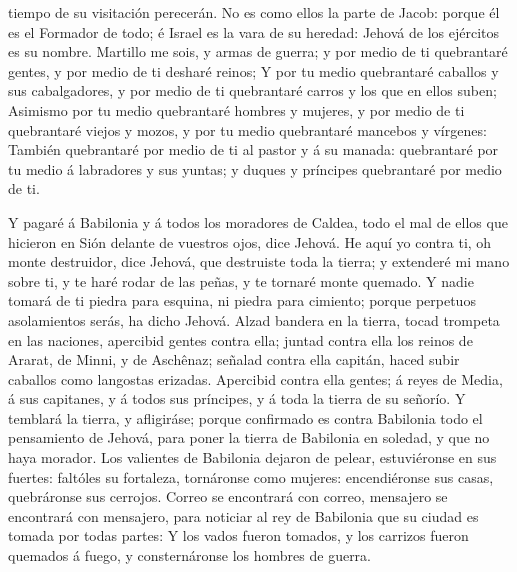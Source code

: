 tiempo de su visitación perecerán.  No es como ellos la
parte de Jacob: porque él es el Formador de todo; é Israel es la vara de
su heredad: Jehová de los ejércitos es su nombre.  Martillo
me sois, y armas de guerra; y por medio de ti quebrantaré gentes, y por
medio de ti desharé reinos;  Y por tu medio quebrantaré
caballos y sus cabalgadores, y por medio de ti quebrantaré carros y los
que en ellos suben;  Asimismo por tu medio quebrantaré
hombres y mujeres, y por medio de ti quebrantaré viejos y mozos, y por
tu medio quebrantaré mancebos y vírgenes:  También
quebrantaré por medio de ti al pastor y á su manada: quebrantaré por tu
medio á labradores y sus yuntas; y duques y príncipes quebrantaré por
medio de ti.

 Y pagaré á Babilonia y á todos los moradores de Caldea,
todo el mal de ellos que hicieron en Sión delante de vuestros ojos, dice
Jehová.  He aquí yo contra ti, oh monte destruidor, dice
Jehová, que destruiste toda la tierra; y extenderé mi mano sobre ti, y
te haré rodar de las peñas, y te tornaré monte quemado.  Y
nadie tomará de ti piedra para esquina, ni piedra para cimiento; porque
perpetuos asolamientos serás, ha dicho Jehová.  Alzad
bandera en la tierra, tocad trompeta en las naciones, apercibid gentes
contra ella; juntad contra ella los reinos de Ararat, de Minni, y de
Aschênaz; señalad contra ella capitán, haced subir caballos como
langostas erizadas.  Apercibid contra ella gentes; á reyes
de Media, á sus capitanes, y á todos sus príncipes, y á toda la tierra
de su señorío.  Y temblará la tierra, y afligiráse; porque
confirmado es contra Babilonia todo el pensamiento de Jehová, para poner
la tierra de Babilonia en soledad, y que no haya morador. 
Los valientes de Babilonia dejaron de pelear, estuviéronse en sus
fuertes: faltóles su fortaleza, tornáronse como mujeres: encendiéronse
sus casas, quebráronse sus cerrojos.  Correo se encontrará
con correo, mensajero se encontrará con mensajero, para noticiar al rey
de Babilonia que su ciudad es tomada por todas partes:  Y
los vados fueron tomados, y los carrizos fueron quemados á fuego, y
consternáronse los hombres de guerra.

